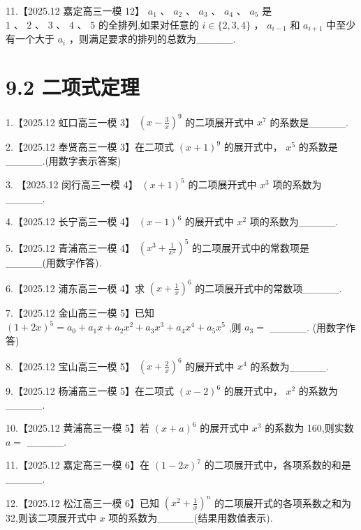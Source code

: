 \documentclass[10pt]{article}
\begin{document}
11.【2025.12 嘉定高三一模 12】 \({a}_{1}\text{ 、 }{a}_{2}\text{ 、 }{a}_{3}\text{ 、 }{a}_{4}\text{ 、 }{a}_{5}\) 是 \(1\text{ 、 }2\text{ 、 }3\text{ 、 }4\text{ 、 }5\) 的全排列,如果对任意的 \(i \in  \{ 2,3,4\}\) ， \({a}_{i - 1}\) 和 \({a}_{i + 1}\) 中至少有一个大于 \({a}_{i}\) ，则满足要求的排列的总数为\_\_\_\_\_.

\section*{9.2 二项式定理}

1.【2025.12 虹口高三一模 3】 \({\left( x - \frac{3}{x}\right) }^{9}\) 的二项展开式中 \({x}^{7}\) 的系数是\_\_\_\_\_.

2.【2025.12 奉贤高三一模 3】在二项式 \({\left( x + 1\right) }^{9}\) 的展开式中， \({x}^{5}\) 的系数是\_\_\_\_\_.(用数字表示答案)

3. 【2025.12 闵行高三一模 4】 \({\left( x + 1\right) }^{5}\) 的二项展开式中 \({x}^{3}\) 项的系数为\_\_\_\_\_.

4.【2025.12 长宁高三一模 4】 \({\left( x - 1\right) }^{6}\) 的展开式中 \({x}^{2}\) 项的系数为\_\_\_\_\_.

5.【2025.12 青浦高三一模 4】 \({\left( {x}^{3} + \frac{1}{{x}^{2}}\right) }^{5}\) 的二项展开式中的常数项是\_\_\_\_\_(用数字作答).

6.【2025.12 浦东高三一模 4】求 \({\left( x + \frac{1}{x}\right) }^{6}\) 的二项展开式中的常数项\_\_\_\_\_.

7.【2025.12 金山高三一模 5】已知 \({\left( 1 + 2x\right) }^{5} = {a}_{0} + {a}_{1}x + {a}_{2}{x}^{2} + {a}_{3}{x}^{3} + {a}_{4}{x}^{4} + {a}_{5}{x}^{5}\) ,则 \({a}_{3} =\) \_\_\_\_\_. (用数字作答)

8.【2025.12 宝山高三一模 5】 \({\left( x + \frac{2}{x}\right) }^{6}\) 的展开式中 \({x}^{4}\) 的系数为\_\_\_\_\_.

9.【2025.12 杨浦高三一模 5】在二项式 \({\left( x - 2\right) }^{6}\) 的展开式中， \({x}^{2}\) 的系数为\_\_\_\_\_.

10.【2025.12 黄浦高三一模 5】若 \({\left( x + a\right) }^{6}\) 的展开式中 \({x}^{3}\) 的系数为 160,则实数 \(a =\) \_\_\_\_\_.

11.【2025.12 嘉定高三一模 6】在 \({\left( 1 - 2x\right) }^{7}\) 的二项展开式中，各项系数的和是\_\_\_\_\_.

12.【2025.12 松江高三一模 6】已知 \({\left( {x}^{2} + \frac{1}{x}\right) }^{n}\) 的二项展开式的各项系数之和为 32,则该二项展开式中 \(x\) 项的系数为\_\_\_\_\_(结果用数值表示).
\end{document}
